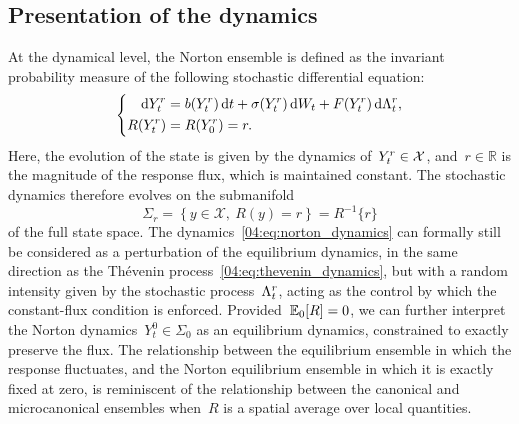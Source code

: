 \subsection{Presentation of the dynamics}\label{04:subsec:norton_presentation}
At the dynamical level, the Norton ensemble is defined as the invariant probability measure of the following stochastic differential equation:
\begin{equation}
    \label{04:eq:norton_dynamics}
    \left\{\begin{aligned}
    \mathrm{d} Y^r_t &= b(Y^r_t)\, \mathrm{d} t + \sigma(Y^r_t)\, \mathrm{d} W_t +  F(Y^r_t)\,\mathrm{d}\Lambda^r_t,\\
    R(Y^r_t) &= R(Y^r_0)=r.
    \end{aligned}\right.
\end{equation}
Here, the evolution of the state is given by the dynamics of~$Y^r_t \in \mathcal X$, and~$r\in \mathbb{R}$ is the magnitude of the response flux, which is maintained constant. The stochastic dynamics therefore evolves on the submanifold
\begin{equation}
    \label{04:eq:norton_submanifold}
    \Sigma_r =\left\{y\in \mathcal{X},\ R(y)=r\right\} = R^{-1}\{r\}
\end{equation}
of the full state space. The dynamics~\eqref{04:eq:norton_dynamics} can formally still be considered as a perturbation of the equilibrium dynamics, in the same direction as the Th\'evenin process~\eqref{04:eq:thevenin_dynamics}, but with a random intensity given by the stochastic process~$\Lambda^r_t$, acting as the control by which the constant-flux condition is enforced. Provided~$\mathbb{E}_0[R]=0$, we can further interpret the Norton dynamics~$Y_t^0 \in \Sigma_0$ as an equilibrium dynamics, constrained to exactly preserve the flux. The relationship between the equilibrium ensemble in which the response fluctuates, and the Norton equilibrium ensemble in which it is exactly fixed at zero, is reminiscent of the relationship between the canonical and microcanonical ensembles when~$R$ is a spatial average over local quantities.

